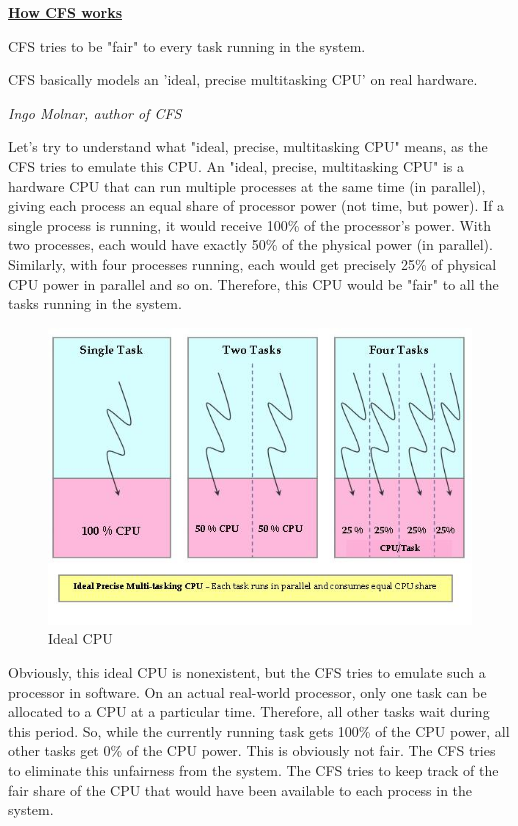 \documentclass{article}
\begin{document}
\bigskip

\textbf{\underline{How CFS works}}

CFS tries to be "fair" to every task running in the system.

\epigraph{CFS basically models an 'ideal, precise multitasking CPU' on real hardware.}{\textit{Ingo Molnar, author of CFS}}

Let's try to understand what "ideal, precise, multitasking CPU" means, as the CFS tries to emulate this CPU. An "ideal, precise, multitasking CPU" is a hardware CPU that can run multiple processes at the same time (in parallel), giving each process an equal share of processor power (not time, but power). If a single process is running, it would receive 100\% of the processor's power. With two processes, each would have exactly 50\% of the physical power (in parallel). Similarly, with four processes running, each would get precisely 25\% of physical CPU power in parallel and so on. Therefore, this CPU would be "fair" to all the tasks running in the system.

\begin{figure}[H]
  \center
  \includegraphics[width=0.7\columnwidth]{./pics/cpu0.jpg}
  \caption{Ideal CPU}
  \label{fig:Ideal CPU}
\end{figure}

Obviously, this ideal CPU is nonexistent, but the CFS tries to emulate such a processor in software. On an actual real-world processor, only one task can be allocated to a CPU at a particular time. Therefore, all other tasks wait during this period. So, while the currently running task gets 100\% of the CPU power, all other tasks get 0\% of the CPU power. This is obviously not fair. The CFS tries to eliminate this unfairness from the system. The CFS tries to keep track of the fair share of the CPU that would have been available to each process in the system.
\end{document}
